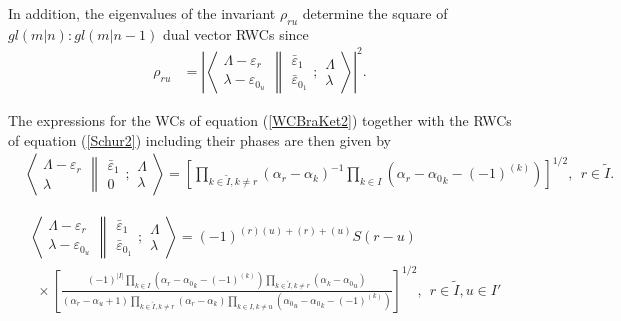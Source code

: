 \documentclass[12pt]{article}
\def\nn{\nonumber}
\begin{document}
In addition, the eigenvalues of the invariant ${\rho}_{ru}$ determine the square of $gl(m|n):gl(m|n-1)$ dual vector RWCs \cite{GIW2} since
\begin{align}
\rho_{ru} &= \left| \left\langle 
\begin{array}{c} \Lambda-\varepsilon_r\\ \lambda-\varepsilon_{0_u} \end{array}
\right\rVert
\left.
\begin{array}{c} \bar{\varepsilon}_1 \\
\bar{\varepsilon}_{0_1}  \end{array}  ; \begin{array}{c} \Lambda \\
\lambda \end{array}
\right\rangle \nn \right|^2.
\end{align}

The expressions for the WCs of equation (\ref{WCBraKet2}) together with the RWCs of equation (\ref{Schur2}) including their phases \cite{GIW3} are then given by
\begin{align}
&\left\langle 
\begin{array}{c} \Lambda-\varepsilon_r\\ \lambda
 \end{array}
\right\rVert
\left.
\begin{array}{c} \bar{\varepsilon}_1 \\ 0 
 \end{array}
; \begin{array}{c} \Lambda \\ \lambda
 \end{array}
\right\rangle
= \left[ \prod_{k\in \tilde{I},k\neq r} \left(\alpha_r - \alpha_k \right)^{-1}\prod_{k\in
I} \left(\alpha_r - {\alpha_0}_k - (-1)^{(k)}\right) \right]^{1/2}
,\ \ r\in \tilde{I} .
\end{align}

\begin{align}
&\left\langle
\begin{array}{c} \Lambda-\varepsilon_r\\ \lambda-\varepsilon_{0_u} 
 \end{array}
\right\rVert
\left.
\begin{array}{c} \bar{\varepsilon}_1 \\ \bar{\varepsilon}_{0_1} 
 \end{array}
; \begin{array}{c} \Lambda \\ \lambda
 \end{array}
\right\rangle
= (-1)^{(r)(u) +(r) + (u)} S(r-u)
\nn \\
&~~\times
\left[
\frac{
(-1)^{|I|}
\prod_{k\in I} \left(\alpha_r - {\alpha_0}_k - (-1)^{(k)}\right)
\prod_{k\in\tilde{I},k \neq r} \left(\alpha_k - {\alpha_0}_u \right)
}
{
({\alpha}_r-{\alpha}_u + 1)
\prod_{k\in \tilde{I},k\neq r} \left(\alpha_r - \alpha_k \right)
\prod_{k\in I,k\neq u} \left({\alpha_0}_u - {\alpha_0}_k - (-1)^{(k)}\right)
} 
\right]^{1/2}
,\ \ r\in \tilde{I},u\in I' \label{FinalUnBarredEven}
\end{align}
\end{document}
